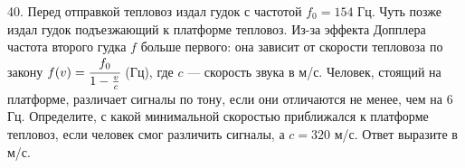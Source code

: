 40. Перед отправкой тепловоз издал гудок с частотой $f_0=154$ Гц. Чуть позже издал гудок подъезжающий к платформе тепловоз. Из-за эффекта Допплера частота второго гудка $f$ больше первого: она зависит от скорости тепловоза по закону $f(v)=\cfrac{f_0}{1-\frac{v}{c}}$ (Гц), где $c$ --- скорость звука в м/с. Человек, стоящий на платформе, различает сигналы по тону, если они отличаются не менее, чем на 6 Гц. Определите, с какой минимальной скоростью приближался к платформе тепловоз, если человек смог различить сигналы, а $c=320$ м/с. Ответ выразите в м/с.\\
